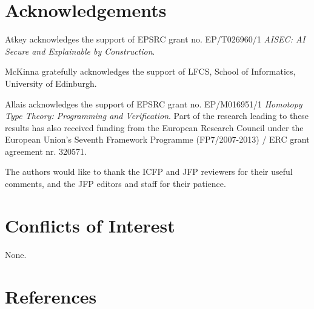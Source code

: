 \documentclass{jfp}
\begin{document}


\section*{Acknowledgements}

Atkey acknowledges the support of EPSRC grant no. EP/T026960/1
\emph{AISEC: AI Secure and Explainable by Construction}.

McKinna gratefully acknowledges the support of LFCS, School of Informatics, University of Edinburgh.

Allais acknowledges the support of EPSRC grant no. EP/M016951/1
\emph{Homotopy Type Theory: Programming and Verification}.
Part of the research leading to these results has also received funding from
the European Research Council under the European Union’s Seventh Framework
Programme (FP7/2007-2013) / ERC grant agreement nr. 320571.

The authors would like to thank the ICFP and JFP reviewers for their
useful comments, and the JFP editors and staff for their patience.

\section*{Conflicts of Interest}

None.


\renewcommand{\bibsection}{}
\section*{References}



\label{lastpage01}
\end{document}
